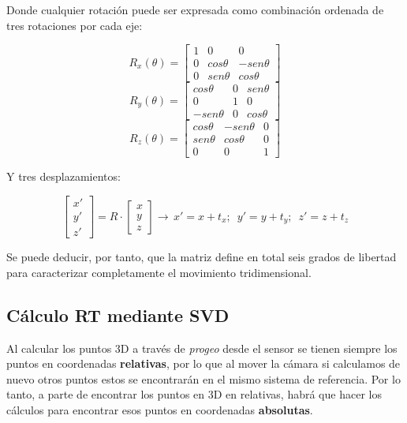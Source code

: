 Donde cualquier rotación puede ser expresada como combinación ordenada de tres rotaciones por cada eje:

\begin{equation}
R_{x}(\theta)=\left[\begin{array}{ccc}
1 & 0 & 0\\
0 & cos\theta & -sen\theta\\
0 & sen\theta & cos\theta
\end{array}\right]
\end{equation}
\begin{equation}
R_{y}(\theta)=\left[\begin{array}{ccc}
cos\theta & 0 & sen\theta\\
0 & 1 & 0\\
-sen\theta & 0 & cos\theta
\end{array}\right]
\end{equation}
\begin{equation}
R_{z}(\theta)=\left[\begin{array}{ccc}
cos\theta & -sen\theta & 0\\
sen\theta & cos\theta & 0\\
0 & 0 & 1
\end{array}\right]
\end{equation}

Y tres desplazamientos:

\begin{equation}
\left[\begin{array}{c}
x'\\
y'\\
z'
\end{array}\right]=R\cdot\left[\begin{array}{c}
x\\
y\\
z
\end{array}\right]\longrightarrow\, x'=x+t_{x};\,\,\, y'=y+t_{y};\,\,\, z'=z+t_{z}
\end{equation}

Se puede deducir, por tanto, que la matriz define en total seis grados de libertad para caracterizar completamente el movimiento tridimensional.

\subsection{Cálculo RT mediante SVD}

Al calcular los puntos 3D a través de \textit{progeo} desde el sensor se tienen siempre los puntos en coordenadas \textbf{relativas}, por lo que al mover la cámara si calculamos de nuevo otros puntos estos se encontrarán en el mismo sistema de referencia. Por lo tanto, a parte de encontrar los puntos en 3D en relativas, habrá que hacer los cálculos para encontrar esos puntos en coordenadas \textbf{absolutas}.


